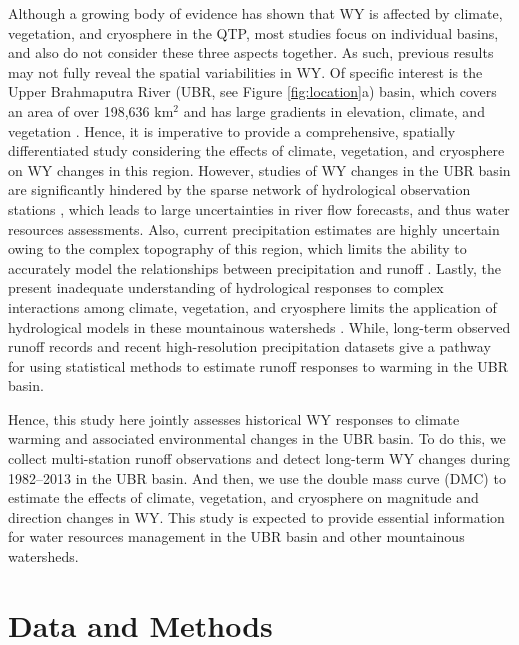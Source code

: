 \documentclass[hess, manuscript]{copernicus}
\begin{document}
Although a growing body of evidence has shown that WY is affected by climate, vegetation, and cryosphere in the QTP, most studies focus on individual basins, and also do not consider these three aspects together. As such, previous results may not fully reveal the spatial variabilities in WY. 
Of specific interest is the Upper Brahmaputra River (UBR, see Figure \ref{fig:location}a) basin, which covers an area of over 198,636 km$^2$ and has large gradients in elevation, climate, and vegetation \citep{li2019spatiotemporal}.
Hence, it is imperative to provide a comprehensive, spatially differentiated study considering the effects of climate, vegetation, and cryosphere on WY changes in this region. 
However, studies of WY changes in the UBR basin are significantly hindered by the sparse network of hydrological observation stations \citep{li2019spatiotemporal,wang2021tp,yao2019recent}, which leads to large uncertainties in river flow forecasts, and thus water resources assessments.
Also, current precipitation estimates are highly uncertain owing to the complex topography of this region, which limits the ability to accurately model the relationships between precipitation and runoff \citep{sun2020precipitation}. 
Lastly, the present inadequate understanding of hydrological responses to complex interactions among climate, vegetation, and cryosphere limits the application of hydrological models in these mountainous watersheds \citep{pellicciotti2012challenges}. 
While, long-term observed runoff records and recent high-resolution precipitation datasets give a pathway for using statistical methods to estimate runoff responses to warming in the UBR basin. 

Hence, this study here jointly assesses historical WY responses to climate warming and associated environmental changes in the UBR basin. To do this, we collect multi-station runoff observations and detect long-term WY changes during 1982--2013 in the UBR basin. And then, we use the double mass curve (DMC) to estimate the effects of climate, vegetation, and cryosphere on magnitude and direction changes in WY. This study is expected to provide essential information for water resources management in the UBR basin and other mountainous watersheds. 

\section{Data and Methods}
\end{document}
